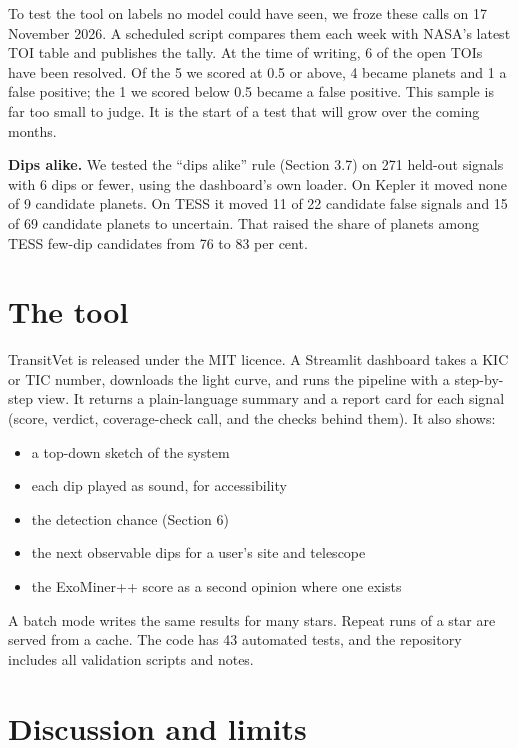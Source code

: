 \documentclass[fleqn,usenatbib]{mnras}
\providecommand{\tightlist}{\setlength{\itemsep}{0pt}\setlength{\parskip}{0pt}}
\begin{document}
To test the tool on labels no model could have seen, we froze these calls on 17 November 2026. A scheduled script compares them each week with NASA's latest TOI table and publishes the tally. At the time of writing, 6 of the open TOIs have been resolved. Of the 5 we scored at 0.5 or above, 4 became planets and 1 a false positive; the 1 we scored below 0.5 became a false positive. This sample is far too small to judge. It is the start of a test that will grow over the coming months.

\textbf{Dips alike.} We tested the ``dips alike'' rule (Section 3.7) on 271 held-out signals with 6 dips or fewer, using the dashboard's own loader. On Kepler it moved none of 9 candidate planets. On TESS it moved 11 of 22 candidate false signals and 15 of 69 candidate planets to uncertain. That raised the share of planets among TESS few-dip candidates from 76 to 83 per cent.

\section{The tool}

TransitVet is released under the MIT licence. A Streamlit dashboard takes a KIC or TIC number, downloads the light curve, and runs the pipeline with a step-by-step view. It returns a plain-language summary and a report card for each signal (score, verdict, coverage-check call, and the checks behind them). It also shows:

\begin{itemize}
\tightlist
\item
  a top-down sketch of the system
\item
  each dip played as sound, for accessibility
\item
  the detection chance (Section 6)
\item
  the next observable dips for a user's site and telescope
\item
  the ExoMiner++ score as a second opinion where one exists
\end{itemize}

A batch mode writes the same results for many stars. Repeat runs of a star are served from a cache. The code has 43 automated tests, and the repository includes all validation scripts and notes.

\section{Discussion and limits}
\end{document}

